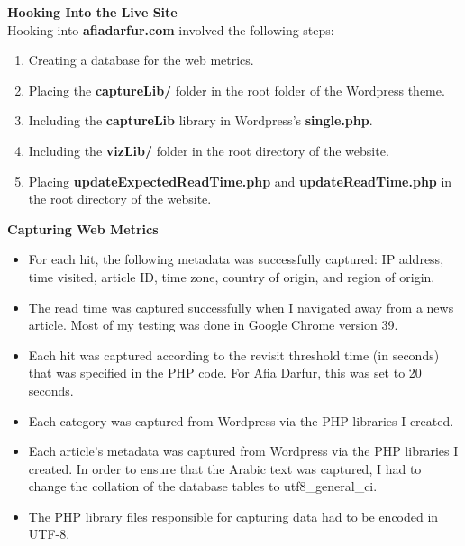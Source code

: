 \documentclass[12pt]{article}
\begin{document}
{\newpage

\noindent\textbf{Hooking Into the Live Site} \\ 

\noindent Hooking into \textbf{afiadarfur.com} involved the following steps:
\begin{enumerate}
\item Creating a database for the web metrics.
\item Placing the \textbf{captureLib/} folder in the root folder of the Wordpress theme.
\item Including the \textbf{captureLib} library in Wordpress's \textbf{single.php}. 
\item Including the \textbf{vizLib/} folder in the root directory of the website.
\item Placing \textbf{updateExpectedReadTime.php} and \textbf{updateReadTime.php} in the root directory of the website. 
\end{enumerate}

\vspace{0.2in}

\noindent\textbf{Capturing Web Metrics} 
\begin{itemize}
\item For each hit, the following metadata was successfully captured: IP address, time visited, article ID, time zone, country of origin, and region of origin.
\item  The read time was captured successfully when I navigated away from a news article. Most of my testing was done in Google Chrome version 39.
\item Each hit was captured according to the revisit threshold time (in seconds) that was specified in the PHP code. For Afia Darfur, this was set to 20 seconds.
\item Each category was captured from Wordpress via the PHP libraries I created.
\item Each article's metadata was captured from Wordpress via the PHP libraries I created. In order to ensure that the Arabic text was captured, I had to change the collation of the database tables to utf8\_general\_ci.
\item The PHP library files responsible for capturing data had to be encoded in UTF-8.
\end{itemize}

\vspace{0.2in}

}
\end{document}
